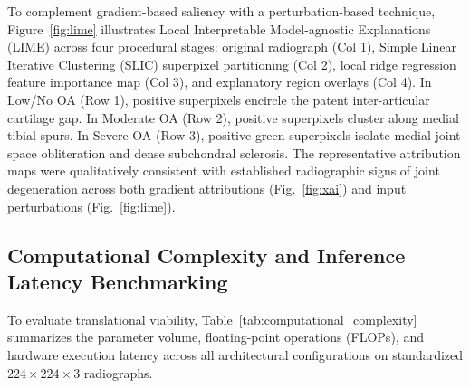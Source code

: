 \documentclass[10pt,journal]{IEEEtran}
\begin{document}
To complement gradient-based saliency with a perturbation-based technique, Figure~\ref{fig:lime} illustrates Local Interpretable Model-agnostic Explanations (LIME) across four procedural stages: original radiograph (Col 1), Simple Linear Iterative Clustering (SLIC) superpixel partitioning (Col 2), local ridge regression feature importance map (Col 3), and explanatory region overlays (Col 4). In Low/No OA (Row 1), positive superpixels encircle the patent inter-articular cartilage gap. In Moderate OA (Row 2), positive superpixels cluster along medial tibial spurs. In Severe OA (Row 3), positive green superpixels isolate medial joint space obliteration and dense subchondral sclerosis. The representative attribution maps were qualitatively consistent with established radiographic signs of joint degeneration across both gradient attributions (Fig.~\ref{fig:xai}) and input perturbations (Fig.~\ref{fig:lime}).

\subsection{Computational Complexity and Inference Latency Benchmarking}
\label{subsec:computational_benchmarking}

To evaluate translational viability, Table~\ref{tab:computational_complexity} summarizes the parameter volume, floating-point operations (FLOPs), and hardware execution latency across all architectural configurations on standardized $224 \times 224 \times 3$ radiographs.
\end{document}
